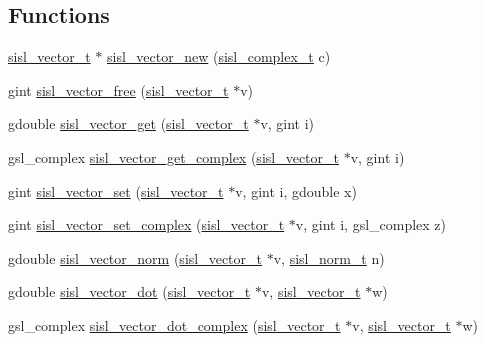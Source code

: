 \subsection*{Functions}
\begin{DoxyCompactItemize}
\item 
\hyperlink{group__vector_gacbac585492f5005f05f0c0b8463039be}{sisl\+\_\+vector\+\_\+t} $\ast$ \hyperlink{group__vector_ga174917724c5ef307cc9d95479e4e9a40}{sisl\+\_\+vector\+\_\+new} (\hyperlink{group__vector_gadbf341f8965fc86dda28912ab5f04930}{sisl\+\_\+complex\+\_\+t} c)
\item 
gint \hyperlink{group__vector_gafedaaf875493835c6ca30030ce1d767a}{sisl\+\_\+vector\+\_\+free} (\hyperlink{group__vector_gacbac585492f5005f05f0c0b8463039be}{sisl\+\_\+vector\+\_\+t} $\ast$v)
\item 
gdouble \hyperlink{group__vector_ga461356df443bbecc3a89173878311f31}{sisl\+\_\+vector\+\_\+get} (\hyperlink{group__vector_gacbac585492f5005f05f0c0b8463039be}{sisl\+\_\+vector\+\_\+t} $\ast$v, gint i)
\item 
gsl\+\_\+complex \hyperlink{group__vector_ga9567ba6afca899f94089827012a933bc}{sisl\+\_\+vector\+\_\+get\+\_\+complex} (\hyperlink{group__vector_gacbac585492f5005f05f0c0b8463039be}{sisl\+\_\+vector\+\_\+t} $\ast$v, gint i)
\item 
gint \hyperlink{group__vector_ga7c5252db656b8e7848ddd754bbe86bee}{sisl\+\_\+vector\+\_\+set} (\hyperlink{group__vector_gacbac585492f5005f05f0c0b8463039be}{sisl\+\_\+vector\+\_\+t} $\ast$v, gint i, gdouble x)
\item 
gint \hyperlink{group__vector_ga4a2722f50dee111ee6f03a5cf28861b1}{sisl\+\_\+vector\+\_\+set\+\_\+complex} (\hyperlink{group__vector_gacbac585492f5005f05f0c0b8463039be}{sisl\+\_\+vector\+\_\+t} $\ast$v, gint i, gsl\+\_\+complex z)
\item 
gdouble \hyperlink{group__vector_ga8275033791c371c8d30bf0abbb05f44a}{sisl\+\_\+vector\+\_\+norm} (\hyperlink{group__vector_gacbac585492f5005f05f0c0b8463039be}{sisl\+\_\+vector\+\_\+t} $\ast$v, \hyperlink{group__vector_gaea7a49b9a1aa9a12bb021ada62a55495}{sisl\+\_\+norm\+\_\+t} n)
\item 
gdouble \hyperlink{group__vector_ga9b8e2a9fbb00ada96f0d327da88f5c64}{sisl\+\_\+vector\+\_\+dot} (\hyperlink{group__vector_gacbac585492f5005f05f0c0b8463039be}{sisl\+\_\+vector\+\_\+t} $\ast$v, \hyperlink{group__vector_gacbac585492f5005f05f0c0b8463039be}{sisl\+\_\+vector\+\_\+t} $\ast$w)
\item 
gsl\+\_\+complex \hyperlink{group__vector_ga6e86d7ca00a219dc151ea78a6c904014}{sisl\+\_\+vector\+\_\+dot\+\_\+complex} (\hyperlink{group__vector_gacbac585492f5005f05f0c0b8463039be}{sisl\+\_\+vector\+\_\+t} $\ast$v, \hyperlink{group__vector_gacbac585492f5005f05f0c0b8463039be}{sisl\+\_\+vector\+\_\+t} $\ast$w)

\end{DoxyCompactItemize}
